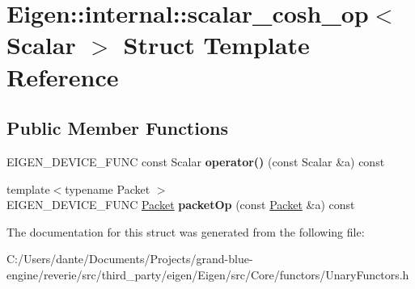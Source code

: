 \hypertarget{struct_eigen_1_1internal_1_1scalar__cosh__op}{}\section{Eigen\+::internal\+::scalar\+\_\+cosh\+\_\+op$<$ Scalar $>$ Struct Template Reference}
\label{struct_eigen_1_1internal_1_1scalar__cosh__op}
\subsection*{Public Member Functions}
\begin{DoxyCompactItemize}
\item 
\mbox{\label{struct_eigen_1_1internal_1_1scalar__cosh__op_a94666c8e625e321cfab01e90ba8df8ad}} 
E\+I\+G\+E\+N\+\_\+\+D\+E\+V\+I\+C\+E\+\_\+\+F\+U\+NC const Scalar {\bfseries operator()} (const Scalar \&a) const
\item 
\mbox{\label{struct_eigen_1_1internal_1_1scalar__cosh__op_ab85234ac5207d6a51dc5512a217e9a92}} 
{\footnotesize template$<$typename Packet $>$ }\\E\+I\+G\+E\+N\+\_\+\+D\+E\+V\+I\+C\+E\+\_\+\+F\+U\+NC \mbox{\hyperlink{union_eigen_1_1internal_1_1_packet}{Packet}} {\bfseries packet\+Op} (const \mbox{\hyperlink{union_eigen_1_1internal_1_1_packet}{Packet}} \&a) const
\end{DoxyCompactItemize}


The documentation for this struct was generated from the following file\+:\begin{DoxyCompactItemize}
\item 
C\+:/\+Users/dante/\+Documents/\+Projects/grand-\/blue-\/engine/reverie/src/third\+\_\+party/eigen/\+Eigen/src/\+Core/functors/Unary\+Functors.\+h\end{DoxyCompactItemize}
